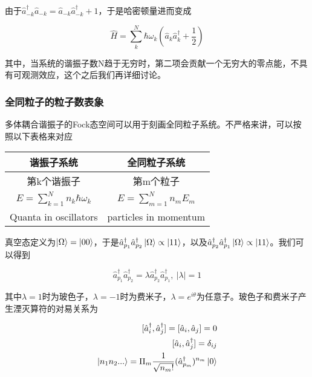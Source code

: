 由于$\hat{a}_{-k}^\dagger\hat{a}_{-k}=\hat{a}_{-k}\hat{a}_{-k}^\dagger+1$，于是哈密顿量进而变成

\begin{equation}
	\hat{H}=\sum_{k}^N\hbar\omega_k(\hat{a}_k\hat{a}_k^\dagger+\frac{1}{2})
\end{equation}

其中，当系统的谐振子数N趋于无穷时，第二项会贡献一个无穷大的零点能，不具有可观测效应，这个之后我们再详细讨论。

\subsubsection{全同粒子的粒子数表象}

多体耦合谐振子的Fock态空间可以用于刻画全同粒子系统。不严格来讲，可以按照以下表格来对应

\begin{center}
    \begin{tabular}{c|c}
        \hline
            谐振子系统 & 全同粒子系统 \\
        \hline
            第k个谐振子 & 第m个粒子 \\
        \hline
            $E=\sum_{k=1}^Nn_k\hbar\omega_k$ & $E=\sum_{m=1}^Nn_mE_m$ \\
        \hline
            Quanta in oscillators & particles in momentum \\
        \hline
        \end{tabular}
\end{center}

真空态定义为$\ket{\Omega}=\ket{00}$，于是$\hat{a}_{p_1}^\dagger\hat{a}_{p_2}^\dagger\ket{\Omega}\propto\ket{11}$，以及$\hat{a}_{p_2}^\dagger\hat{a}_{p_1}^\dagger\ket{\Omega}\propto\ket{11}$。我们可以得到

\begin{equation}
    \hat{a}_{p_1}^\dagger\hat{a}_{p_2}^\dagger=\lambda\hat{a}_{p_2}^\dagger\hat{a}_{p_1}^\dagger,\ |\lambda|=1
\end{equation}

其中$\lambda=1$时为玻色子，$\lambda=-1$时为费米子，$\lambda=e^{i\theta}$为任意子。玻色子和费米子产生湮灭算符的对易关系为

\begin{equation}
    \begin{split}
        [\hat{a}_i^\dagger,\hat{a}_j^\dagger]=[\hat{a}_i,\hat{a}_j]=0 \\
        [\hat{a}_i,\hat{a}_j^\dagger]=\delta_{ij} \\
        \ket{n_1n_2...}=\Pi_m\frac{1}{\sqrt{n_m!}}(\hat{a}_{p_m}^\dagger)^{n_m}\ket{0}
    \end{split}
\end{equation}

